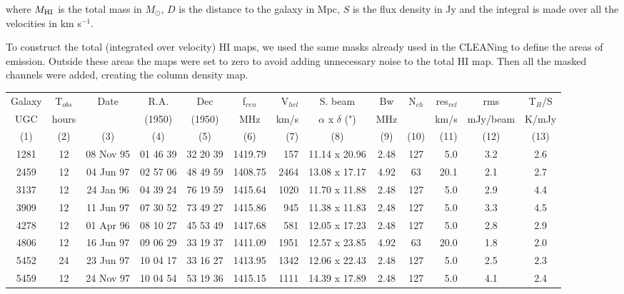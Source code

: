 \documentclass{aa}
\begin{document}
where $M_{\rm{HI}}$ is the total mass in $M_{\odot}$, $D$ is the distance to
the galaxy in Mpc, $S$ is the flux density in Jy and the integral is
made over all the velocities in km s$^{-1}$.

\label{totalhi}

To construct the total (integrated over velocity) HI maps, we used the
same masks already used in the CLEANing to define the areas of
emission. Outside these areas the maps were set to zero to avoid adding
unnecessary noise to the total HI map. Then all the masked channels
were added, creating the column density map. 

\begin{table}
\begin{tabular}{ccccclrcccrcc}
\hline
Galaxy & T$_{obs}$ & \multicolumn{1}{c}{Date} & R.A. & Dec & \multicolumn{1}{c}{f$_{cen}$} & V$_{hel}$ & S. beam & Bw & N$_{ch}$ & res$_{vel}$ & \multicolumn{1}{c}{rms} & T$_B$/S \\
UGC & hours & & (1950) & (1950) & \multicolumn{1}{c}{MHz} & km/s & $\alpha$ x $\delta$ (") & MHz & & km/s & \multicolumn{1}{c}{mJy/beam} & K/mJy \\
(1) & (2) & \multicolumn{1}{c}{(3)} & (4) & (5) & \multicolumn{1}{c}{(6)} & (7) & (8) & (9) & (10) & (11) & (12) & (13)    \\
\hline\hline
1281 & 12 & 08 Nov 95 & 01 46 39 & 32 20 39 & 1419.79 &      157 & 11.14 x 20.96 & 2.48 & 127 & 5.0 & 3.2 & 2.6 \\
2459 & 12 & 04 Jun 97 & 02 57 06 & 48 49 59 & 1408.75 &     2464 & 13.08 x 17.17 & 4.92 &  63 & 20.1 & 2.1 & 2.7 \\
3137 & 12 & 24 Jan 96 & 04 39 24 & 76 19 59 & 1415.64 &     1020 & 11.70 x 11.88 & 2.48 & 127 & 5.0 & 2.9 & 4.4 \\
3909 & 12 & 11 Jun 97 & 07 30 52 & 73 49 27 & 1415.86 &      945 & 11.38 x 11.83 & 2.48 & 127 & 5.0 & 3.3 & 4.5 \\
4278 & 12 & 01 Apr 96 & 08 10 27 & 45 53 49 & 1417.68 &      581 & 12.05 x 17.23 & 2.48 & 127 & 5.0 & 2.8 & 2.9 \\
4806 & 12 & 16 Jun 97 & 09 06 29 & 33 19 37 & 1411.09 &     1951 & 12.57 x 23.85 & 4.92 &  63 & 20.0 & 1.8 & 2.0 \\
5452 & 24 & 23 Jun 97 & 10 04 17 & 33 16 27 & 1413.95 &     1342 & 12.06 x 22.43 & 2.48 & 127 & 5.0 & 2.5 & 2.3 \\
5459 & 12 & 24 Nov 97 & 10 04 54 & 53 19 36 & 1415.15 &     1111 & 14.39 x 17.89 & 2.48 & 127 & 5.0 & 4.1 & 2.4 \\

\end{tabular}
\end{table}
\end{document}
